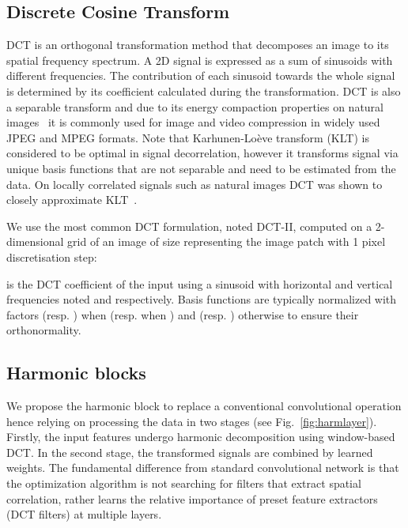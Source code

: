\documentclass[12pt,a4paper]{article}
\begin{document}
\subsection{Discrete Cosine Transform} \label{sec:dct}

DCT is an orthogonal transformation method that decomposes an image to its spatial frequency spectrum. A 2D signal is expressed as a sum of sinusoids with different frequencies. The contribution of each sinusoid towards the whole signal is determined by its coefficient calculated during the transformation.
DCT is also a separable transform and due to its energy compaction properties on natural images~\cite{Wang12} it is commonly used for image and video compression in widely used JPEG and MPEG formats. Note that Karhunen-Lo{\`e}ve transform (KLT) is considered to be optimal in signal decorrelation, however it transforms signal via unique basis functions that are not separable and need to be estimated from the data. On locally correlated signals such as natural images DCT was shown to closely approximate KLT~\cite{Wang12}.

We use the most common DCT formulation, noted DCT-II,  computed on a 2-dimensional grid of an image  of size  representing the image patch with 1 pixel discretisation step:

 is  the DCT coefficient  of the input  using a sinusoid with horizontal and vertical frequencies noted   and  respectively. Basis functions are typically normalized with factors  (resp. ) when  (resp. when )   and  (resp. ) otherwise to ensure their orthonormality. 


\subsection{Harmonic blocks}

We propose the harmonic block  to replace a conventional convolutional operation hence relying on processing the data in two stages (see Fig.~\ref{fig:harmlayer}). Firstly, the input features undergo harmonic decomposition using window-based DCT. 
In the second stage, the transformed signals are combined by learned weights. 
The fundamental difference from standard convolutional network is that the optimization algorithm is not searching for filters that extract spatial correlation, rather learns the relative importance of preset feature extractors (DCT filters) at multiple layers.
\end{document}
